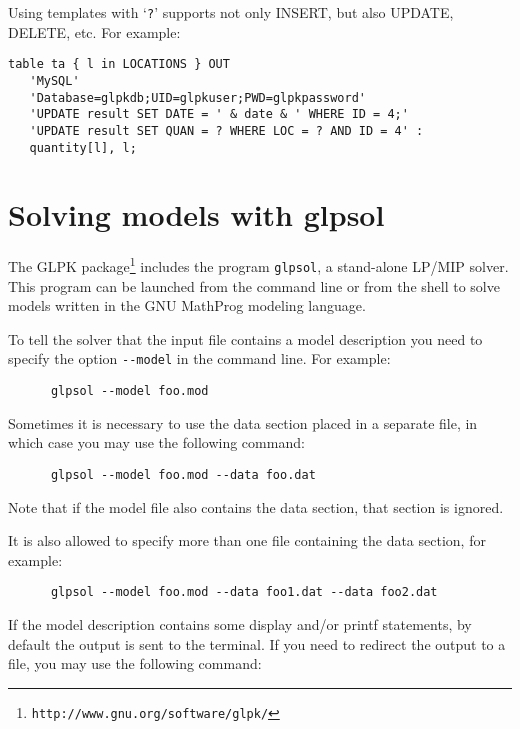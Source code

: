 \documentclass[11pt]{report}
\begin{document}
\newpage

Using templates with `\verb|?|' supports not only INSERT, but also
UPDATE, DELETE, etc. For example:

\begin{verbatim}
table ta { l in LOCATIONS } OUT
   'MySQL'
   'Database=glpkdb;UID=glpkuser;PWD=glpkpassword'
   'UPDATE result SET DATE = ' & date & ' WHERE ID = 4;'
   'UPDATE result SET QUAN = ? WHERE LOC = ? AND ID = 4' :
   quantity[l], l;
\end{verbatim}


\chapter{Solving models with glpsol}

The GLPK package\footnote{{\tt http://www.gnu.org/software/glpk/}}
includes the program {\tt glpsol}, a stand-alone LP/MIP solver. This
program can be launched from the command line or from the shell to
solve models written in the GNU MathProg modeling language.

To tell the solver that the input file contains a model description you
need to specify the option \verb|--model| in the command line.
For example:

\begin{verbatim}
      glpsol --model foo.mod
\end{verbatim}

Sometimes it is necessary to use the data section placed in a separate
file, in which case you may use the following command:

\begin{verbatim}
      glpsol --model foo.mod --data foo.dat
\end{verbatim}

\noindent Note that if the model file also contains the data section,
that section is ignored.

It is also allowed to specify more than one file containing the data
section, for example:

\begin{verbatim}
      glpsol --model foo.mod --data foo1.dat --data foo2.dat
\end{verbatim}

If the model description contains some display and/or printf
statements, by default the output is sent to the terminal. If you need
to redirect the output to a file, you may use the following command:
\end{document}
